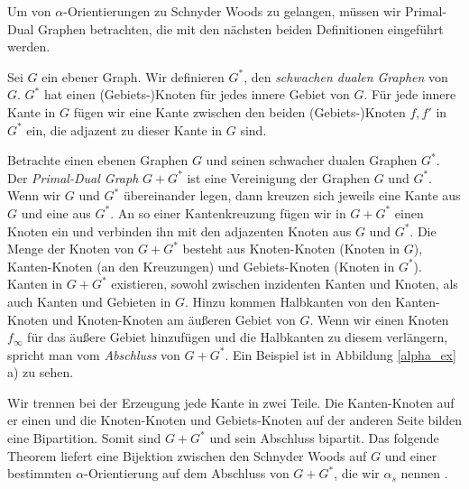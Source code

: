 Um von $\alpha$-Orientierungen zu Schnyder Woods zu gelangen, müssen wir Primal-Dual Graphen betrachten, die mit den nächsten beiden Definitionen eingeführt werden.

\begin{definition}
Sei $G$ ein ebener Graph. Wir definieren $G^*$, den \textit{schwachen dualen Graphen} von $G$. $G^*$ hat einen (Gebiets-)Knoten für jedes innere Gebiet von $G$. Für jede innere Kante in $G$ fügen wir eine Kante zwischen den beiden (Gebiets-)Knoten $f,f'$ in $G^*$ ein, die adjazent zu dieser Kante in $G$ sind.
\end{definition}

\begin{definition}
Betrachte einen ebenen Graphen $G$ und seinen schwacher dualen Graphen $G^*$. Der \textit{Primal-Dual Graph} $G+G^*$ ist eine Vereinigung der Graphen $G$ und $G^*$. Wenn wir $G$ und $G^*$ übereinander legen, dann kreuzen sich jeweils eine Kante aus $G$ und eine aus $G^*$. An so einer Kantenkreuzung fügen wir in $G+G^*$ einen Knoten ein und verbinden ihn mit den adjazenten Knoten aus $G$ und $G^*$. Die Menge der Knoten von $G+G^*$ besteht aus Knoten-Knoten (Knoten in $G$), Kanten-Knoten (an den Kreuzungen) und Gebiets-Knoten (Knoten in $G^*$). Kanten in $G+G^*$ existieren, sowohl zwischen inzidenten Kanten und Knoten, als auch Kanten und Gebieten in $G$. Hinzu kommen Halbkanten von den Kanten-Knoten und Knoten-Knoten am äußeren Gebiet von $G$. Wenn wir einen Knoten $f_\infty$ für das äußere Gebiet hinzufügen und die Halbkanten zu diesem verlängern, spricht man vom \textit{Abschluss} von $G+G^*$. Ein Beispiel ist in Abbildung \ref{alpha_ex} a) zu sehen.

\end{definition}

Wir trennen bei der Erzeugung jede Kante in zwei Teile. Die Kanten-Knoten auf er einen und die Knoten-Knoten und Gebiets-Knoten auf der anderen Seite bilden eine Bipartition. Somit sind $G+G^*$ und sein Abschluss bipartit. Das folgende Theorem liefert eine Bijektion zwischen den Schnyder Woods auf $G$ und einer bestimmten $\alpha$-Orientierung auf dem Abschluss von $G+G^*$, die wir $\alpha_s$ nennen \cite[Propositionen 3 und 4]{felsner04}.

